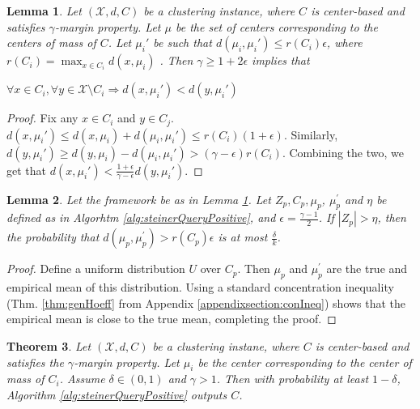 \documentclass{article}
\newcommand{\mc}{\mathcal}
\newtheorem{theorem}{Theorem}
\newtheorem{lemma}[theorem]{Lemma}
\begin{document}
\begin{lemma}
\label{lemma:hasGammaMargin}
Let $(\mc X, d, C)$ be a clustering instance, where $C$ is center-based and satisfies $\gamma$-margin property. Let $\mu$ be the set of centers corresponding to the centers of mass of $C$. Let $\mu_i'$ be such that $d(\mu_i, \mu_i') \le r(C_i)\epsilon$, where $r(C_i) = \max_{x\in C_i}d(x, \mu_i)$ . Then $\gamma \ge 1 + 2\epsilon$ implies that 

\begin{center}$\forall x \in C_i, \forall y \in {\mc X} \setminus C_i \Rightarrow d(x, \mu_i') < d(y, \mu_i')$\end{center}
\end{lemma}

\begin{proof}
Fix any $x \in C_i$ and $y \in C_j$. $d(x, \mu_i') \le d(x, \mu_i)+d(\mu_i, \mu_i') \le r(C_i) (1+\epsilon)$. Similarly, $d(y, \mu_i') \ge d(y, \mu_i) - d(\mu_i, \mu_i') > (\gamma -\epsilon)r(C_i)$. Combining the two, we get that $d(x, \mu_i') < \frac{1+\epsilon}{\gamma-\epsilon}d(y, \mu_i')$. 
\end{proof}

\begin{lemma}
\label{lemma:phase1}
Let the framework be as in Lemma \ref{lemma:hasGammaMargin}. Let $Z_p, C_p, \mu_p$, $\mu_p^\prime$ and $\eta$ be defined as in Algorhtm \ref{alg:steinerQueryPositive}, and $\epsilon = \frac{\gamma - 1}{2}$. If $|Z_p| > \eta$, then the probability that $d(\mu_p, \mu_p^\prime) > r(C_p)\epsilon$ is at most $\frac{\delta}{k}$.
\end{lemma}
\begin{proof}
Define a uniform distribution $U$ over $C_p$. Then $\mu_p$ and $\mu_p^\prime$ are the true and empirical mean of this distribution. Using a standard concentration inequality (Thm. \ref{thm:genHoeff} from Appendix \ref{appendixsection:conIneq}) shows that the empirical mean is close to the true mean, completing the proof.

\end{proof}

\begin{theorem}
\label{thm:steinerQueryPositive}
Let $(\mc X, d, C)$ be a clustering instane, where $C$ is center-based and satisfies the $\gamma$-margin property. Let $\mu_i$ be the center corresponding to the center of mass of $C_i$.
Assume $\delta \in (0, 1)$ and $\gamma > 1$. Then with probability at least $1-\delta$, Algorithm \ref{alg:steinerQueryPositive} outputs $C$.
\end{theorem}
\end{document}
